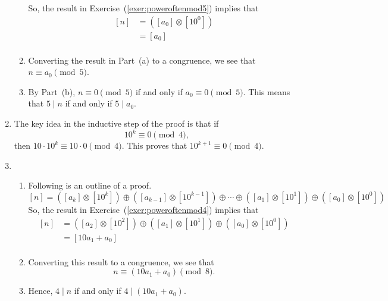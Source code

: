 \begin{enumerate}
\begin{enumerate}
So, the result in Exercise~(\ref{exer:poweroftenmod5}) implies that
\[
\begin{aligned}
  \left[ n \right] &= \left( {\left[ {a_0 } \right] \otimes \left[ {10^0 } \right]} \right) \\ 
                   &= \left[ {a_0 } \right] \\ 
\end{aligned}
\]
\item Converting the result in Part~(a) to a congruence, we see that \\ 
$n \equiv  {a_0 }  \pmod 5$.

\item By Part~(b),  $n \equiv 0 \pmod 5$  if and only if  
$ {a_0 }  \equiv 0 \pmod 5$.  This means that $5 \mid n$ if and only if  
$5 \mid  {a_0 } $.
\end{enumerate}



\item The key idea in the inductive step of the proof is that if
\[
10^k \equiv 0 \pmod 4,
\]
then $10 \cdot 10^k \equiv 10 \cdot 0 \pmod 4$.  This proves that $10^{k+1} \equiv 0 \pmod 4$.

\item \begin{enumerate}
\item Following is an outline of a proof.
\[
  \left[ n \right] = \left( {\left[ {a_k } \right] \otimes \left[ {10^k } \right]} \right) \oplus \left( {\left[ {a_{k - 1} } \right] \otimes \left[ {10^{k - 1} } \right]} \right) \oplus  \cdots  \oplus \left( {\left[ {a_1 } \right] \otimes \left[ {10^1 } \right]} \right) \oplus \left( {\left[ {a_0 } \right] \otimes \left[ {10^0 } \right]} \right)
\]
So, the result in Exercise~(\ref{exer:poweroftenmod4}) implies that
\[
\begin{aligned}
  \left[ n \right] &= \left( {\left[ {a_2 } \right] \otimes \left[ {10^2 } \right]} \right) \oplus \left( {\left[ {a_1 } \right] \otimes \left[ {10^1 } \right]} \right) \oplus \left( {\left[ {a_0 } \right] \otimes \left[ {10^0 } \right]} \right) \\ 
   &= \left[ {10a_1  + a_0 } \right] \\ 
\end{aligned}
\]

\item Converting this result to a congruence, we see that  
\[
n \equiv \left( {10a_1  + a_0 } \right) \pmod 8.
\]

\item Hence, $4 \mid n$ if and only if $4 \mid \left( {10a_1  + a_0 } \right)$.
\end{enumerate}





\end{enumerate}
